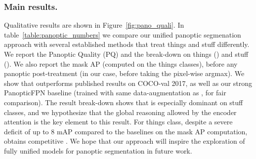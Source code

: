 \subsubsection{Main results.} Qualitative results are shown in
Figure~\ref{fig:pano_quali}. In table~\ref{table:panoptic_numbers}  we compare
our unified panoptic segmenation approach with several established methods that
treat things and stuff differently. We report the Panoptic Quality (PQ) and the
break-down on things () and stuff (). We also report the mask AP (computed on the
things classes), before any panoptic post-treatment (in our case, before taking
the pixel-wise argmax).
We show that \detr outperforms published results on COCO-val 2017, as well as
our strong PanopticFPN baseline (trained with same data-augmentation 
as \detr, for fair comparison). The result break-down shows that \detr is
especially dominant on stuff classes, and we hypothesize that the global
reasoning allowed by the encoder attention is the key element to this result.
For things class, despite a severe deficit of up to 8 mAP compared to the
baselines on the mask AP computation, \detr obtains competitive
.
We hope that our approach will inspire the exploration of fully unified models for panoptic segmentation in future work.
